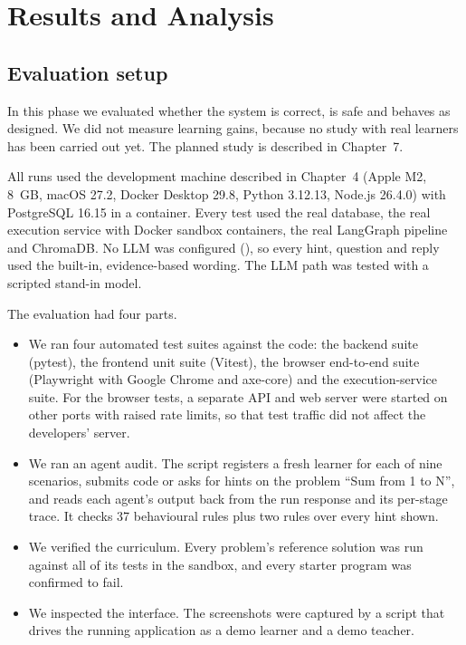 \chapter{Results and Analysis}\label{ch:results}





\section{Evaluation setup}
In this phase we evaluated whether the system is correct, is safe and behaves as designed. We did not measure learning gains, because no study with real learners has been carried out yet. The planned study is described in Chapter~7.

All runs used the development machine described in Chapter~4 (Apple M2, 8~GB, macOS 27.2, Docker Desktop 29.8, Python 3.12.13, Node.js 26.4.0) with PostgreSQL 16.15 in a container. Every test used the real database, the real execution service with Docker sandbox containers, the real LangGraph pipeline and ChromaDB. No LLM was configured (), so every hint, question and reply used the built-in, evidence-based wording. The LLM path was tested with a scripted stand-in model.

The evaluation had four parts.
\begin{itemize}
\item We ran four automated test suites against the code: the backend suite (pytest), the frontend unit suite (Vitest), the browser end-to-end suite (Playwright with Google Chrome and axe-core) and the execution-service suite. For the browser tests, a separate API and web server were started on other ports with raised rate limits, so that test traffic did not affect the developers' server.
\item We ran an agent audit. The script  registers a fresh learner for each of nine scenarios, submits code or asks for hints on the problem ``Sum from 1 to N'', and reads each agent's output back from the run response and its per-stage trace. It checks 37 behavioural rules plus two rules over every hint shown.
\item We verified the curriculum. Every problem's reference solution was run against all of its tests in the sandbox, and every starter program was confirmed to fail.
\item We inspected the interface. The screenshots were captured by a script that drives the running application as a demo learner and a demo teacher.
\end{itemize}

